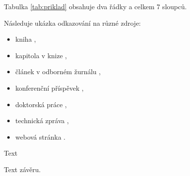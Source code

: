 

Tabulka \ref{tab:priklad} obsahuje dva řádky a celkem 7 sloupců.



Následuje ukázka odkazování na různé zdroje:
\begin{itemize}
	\item kniha \cite{HRW1997},
	\item kapitola v knize \cite{Delorme2006},
	\item článek v odborném žurnálu \cite{Bourreau2006},
	\item konferenční příspěvek \cite{Judish1999},
	\item doktorská práce \cite{Valente2005},
	\item technická zpráva \cite{Fralick1997},
	\item webová stránka \cite{WWWCST}.
\end{itemize}





Text


Text závěru.


